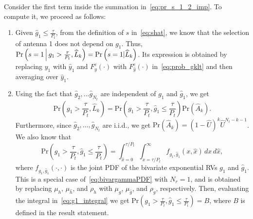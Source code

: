 \documentclass[12pt,draftcls,peerreview,onecolumn]{IEEEtran}
\newcommand{\brac}[1]{\left({#1}\right)}
\newcommand{\prob}[1]{\text{Pr}\brac{#1}}
\newcommand{\given}{\arrowvert}
\newcommand{\Given}{\Big\arrowvert}
\newcommand{\setA}{A}
\newcommand{\setAkhat}{\widehat{\setA}_k}
\newcommand{\setL}{L}
\newcommand{\setLkhat}{\widehat{\setL}_k}
\newcommand{\mug}{{\mu_{g}}}
\newcommand{\muh}{{\mu_{h}}}
\newcommand{\Nt}{{N_t}}
\newcommand{\Nr}{{N_r}}
\newcommand{\Pt}{{P_t}}
\newcommand{\such}{h}
\newcommand{\puch}{g}
\newcommand{\gk}[1]{{\puch_{#1}}}
\newcommand{\itau}{\tau}
\newcommand{\taubypt}{\frac{\itau}{\Pt}}
\newcommand{\gkgrtaubypt}[1]{{\gk{#1}}>\taubypt}
\newcommand{\gkhatlttaubypt}[1]{{\gkhat{#1}}\leq\taubypt}
\newcommand{\yk}[1]{y_{#1}}
\newcommand{\un}{U}
\newcommand{\unhat}{\widehat{\un}}
\newcommand{\gpilotpower}{P_g}
\newcommand{\hhat}{\hat{\such}}
\newcommand{\ghat}{\hat{\puch}}
\newcommand{\yhat}{\hat{y}}
\newcommand{\gkhat}[1]{\ghat_{#1}}
\newcommand{\ykhat}[1]{\hat{y}_{#1}}
\newcommand{\muhhat}{\mu_{\hhat}}
\newcommand{\mughat}{\mu_{\ghat}}
\newcommand{\Probglt}{B}
\newcommand{\rhog}{\rho_g}
\newcommand{\rhoh}{\rho_h}
\newcommand{\ccdfyrv}[1]{ F^{c}_{y}\left(#1 \right) }
\newcommand{\ccdfyhatrv}[1]{F^{c}_{\yhat}\left(#1 \right) }
\newcommand{\xhat}{\hat{x}}
\begin{document}
Consider the first term inside the summation in~\eqref{eq:pr_s_1_2_imp}. To compute it, we proceed as follows:
\begin{enumerate}
\item  Given $\gkhatlttaubypt{1}$, from the definition of $s$ in~\eqref{eq:shat}, we know that the selection of antenna 1 does not depend on $\gk{1}$. Thus, $\prob{s = 1 \Given \gkgrtaubypt{1},\setLkhat}=\prob{s = 1 \given \setLkhat}$. Its expression is obtained by replacing $\yk{1}$ with $\ykhat{1}$ and $\ccdfyrv{\cdot}$ with $\ccdfyhatrv{\cdot}$ in~\eqref{eq:prob_gklt} and then averaging over $\ykhat{1}$. 

\item Using the fact that $\gkhat{2},\ldots\gkhat{\Nt}$ are independent of $\gk{1}$ and $\gkhat{1}$, we get  
\begin{equation}
\prob{\gkgrtaubypt{1},\setLkhat} =\prob{\gkgrtaubypt{1},\gkhatlttaubypt{1}}\prob{\setAkhat}. 
\end{equation}
Furthermore, since $\gkhat{2},\ldots,\gkhat{\Nt}$ are i.i.d., we get $\prob{\setAkhat}=\left(1- \unhat \right)^{k} \unhat^{\Nt-k-1}$. We also know that 
\begin{equation}
\label{eq:g1_integral}
\prob{\gkgrtaubypt{1},\gkhatlttaubypt{1}}=\int_{\xhat=0}^{\tau/\Pt}\int_{x=\tau/\Pt}^{\infty}f_{\gk{1},\gkhat{1}}\left(x,\xhat \right)\,dx\, d\xhat,
\end{equation}
where $f_{\gk{1},\gkhat{1}}\left(\cdot,\cdot \right)$ is the joint PDF of the bivariate exponential RVs $\gk{1}$ and $\gkhat{1}$.  This is a special case of~\eqref{eq:bivargammaPDF} with $\Nr=1$, and is obtained by replacing $\muh$, $\muhhat$, and $\rhoh$ with $\mug$, $\mughat$, and $\rhog$, respectively.
\label{eq:bivargPDF}
Then, evaluating the integral in~\eqref{eq:g1_integral} we get $\prob{\gkgrtaubypt{1},\gkhatlttaubypt{1}} \!=\! \Probglt$, where $\Probglt$ is defined in the result statement.
\end{enumerate}
\end{document}
